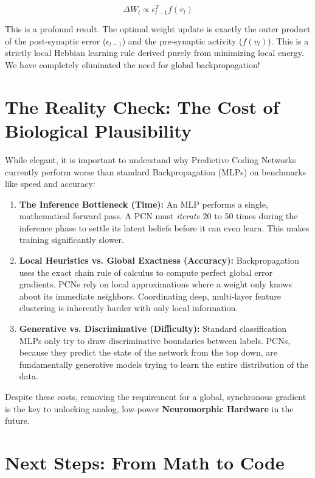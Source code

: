 \documentclass[12pt]{article}
\begin{document}
\begin{equation}
    \Delta W_l \propto \epsilon_{l-1}^T f(v_l)
\end{equation}

This is a profound result. The optimal weight update is exactly the outer product of the post-synaptic error ($\epsilon_{l-1}$) and the pre-synaptic activity ($f(v_l)$). This is a strictly local Hebbian learning rule derived purely from minimizing local energy. We have completely eliminated the need for global backpropagation!

\section*{The Reality Check: The Cost of Biological Plausibility}

While elegant, it is important to understand why Predictive Coding Networks currently perform worse than standard Backpropagation (MLPs) on benchmarks like speed and accuracy:

\begin{enumerate}
    \item \textbf{The Inference Bottleneck (Time):} An MLP performs a single, mathematical forward pass. A PCN must \textit{iterate} 20 to 50 times during the inference phase to settle its latent beliefs before it can even learn. This makes training significantly slower.
    \item \textbf{Local Heuristics vs. Global Exactness (Accuracy):} Backpropagation uses the exact chain rule of calculus to compute perfect global error gradients. PCNs rely on local approximations where a weight only knows about its immediate neighbors. Coordinating deep, multi-layer feature clustering is inherently harder with only local information.
    \item \textbf{Generative vs. Discriminative (Difficulty):} Standard classification MLPs only try to draw discriminative boundaries between labels. PCNs, because they predict the state of the network from the top down, are fundamentally generative models trying to learn the entire distribution of the data. 
\end{enumerate}

Despite these costs, removing the requirement for a global, synchronous gradient is the key to unlocking analog, low-power \textbf{Neuromorphic Hardware} in the future.

\section*{Next Steps: From Math to Code}
\end{document}
